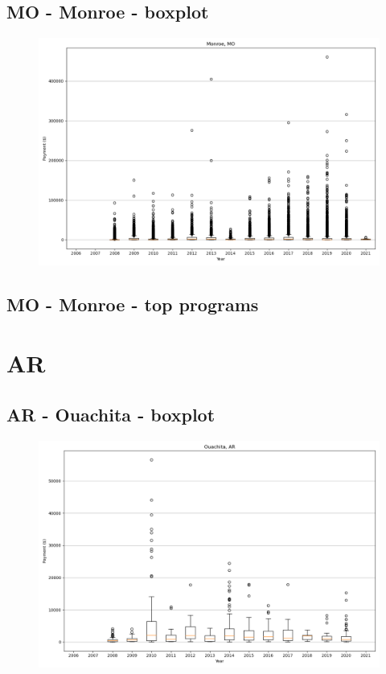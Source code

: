 \subsection*{MO - Monroe - boxplot}
\begin{figure}[h]
\centering
\includegraphics[width=7in]{../output/boxplots/counties/Monroe-MO_boxplot.png}
\end{figure}


\subsection*{MO - Monroe - top programs}

\newpage
\section*{AR}
\subsection*{AR - Ouachita - boxplot}
\begin{figure}[h]
\centering
\includegraphics[width=7in]{../output/boxplots/counties/Ouachita-AR_boxplot.png}
\end{figure}


